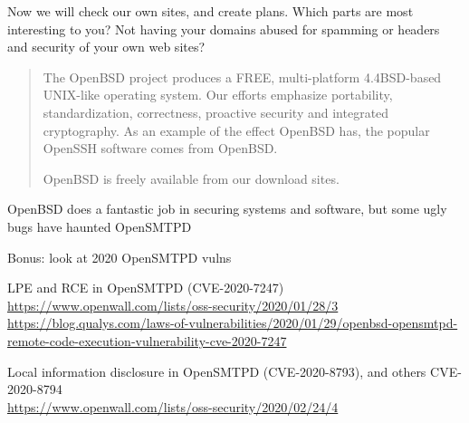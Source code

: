\documentclass[Screen16to9,17pt]{foils}
\begin{document}
Now we will check our own sites, and create plans. Which parts are most interesting to you? Not having your domains abused for spamming or headers and security of your own web sites?



\begin{quote}
The OpenBSD project produces a FREE, multi-platform 4.4BSD-based UNIX-like operating system. Our efforts emphasize portability, standardization, correctness, proactive security and integrated cryptography. As an example of the effect OpenBSD has, the popular OpenSSH software comes from OpenBSD.

OpenBSD is freely available from our download sites.
\end{quote}

\begin{list2}
\item OpenBSD does a fantastic job in securing systems and software, but some ugly bugs have haunted OpenSMTPD
\item Bonus: look at 2020 OpenSMTPD vulns
\item LPE and RCE in OpenSMTPD (CVE-2020-7247)\\{\footnotesize
\url{https://www.openwall.com/lists/oss-security/2020/01/28/3}\\
\url{https://blog.qualys.com/laws-of-vulnerabilities/2020/01/29/openbsd-opensmtpd-remote-code-execution-vulnerability-cve-2020-7247}}
\item Local information disclosure in OpenSMTPD (CVE-2020-8793), and others CVE-2020-8794\\{\footnotesize
\url{https://www.openwall.com/lists/oss-security/2020/02/24/4}}

\end{list2}







\slidenext
\end{document}
